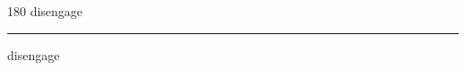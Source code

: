 
\begin{frame}
\begin{center}
\begin{turn}{180}
{\fontsize{2.5cm}{1em}\selectfont disengage}
\end{turn}
\vspace{1em}\par  
\hrule
\vspace{1em}\par  
{\fontsize{2.5cm}{1em}\selectfont disengage}
\end{center}
\end{frame}
